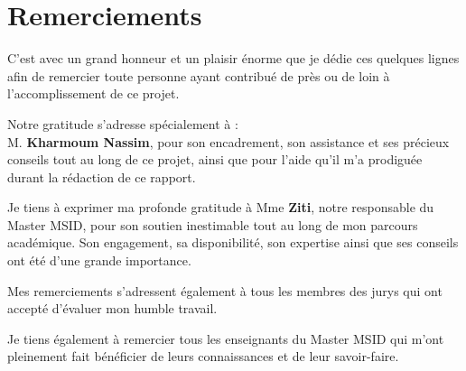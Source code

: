 \chapter*{Remerciements}
\begin{center}
    \vspace{2cm}
\onehalfspacing
 \vspace{1cm}
\onehalfspacing

C’est avec un grand honneur et un plaisir énorme que je dédie ces quelques lignes afin de remercier toute personne ayant contribué de près ou de loin à l’accomplissement de ce projet.

\vspace{0.5cm}

Notre gratitude s’adresse spécialement à :\\
M. \textbf{Kharmoum Nassim}, pour son encadrement, son assistance et ses précieux conseils tout au long de ce projet, ainsi que pour l’aide qu’il m’a prodiguée durant la rédaction de ce rapport.

\vspace{0.5cm}

Je tiens à exprimer ma profonde gratitude à Mme \textbf{Ziti}, notre responsable du Master MSID, pour son soutien inestimable tout au long de mon parcours académique. Son engagement, sa disponibilité, son expertise ainsi que ses conseils ont été d’une grande importance.

\vspace{0.5cm}

Mes remerciements s’adressent également à tous les membres des jurys qui ont accepté d’évaluer mon humble travail.

\vspace{0.5cm}

Je tiens également à remercier tous les enseignants du Master MSID qui m'ont pleinement fait bénéficier de leurs connaissances et de leur savoir-faire.

\end{center}
 
